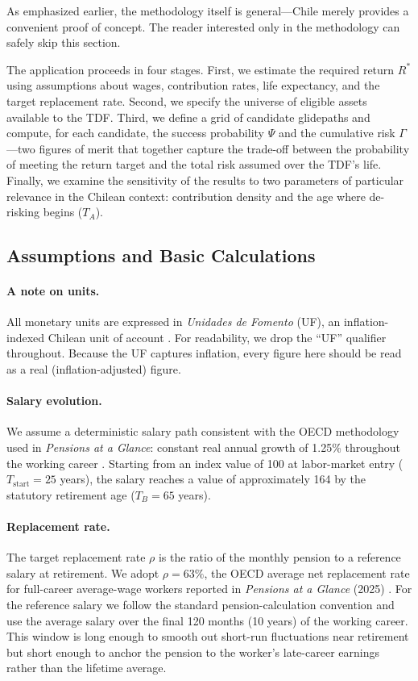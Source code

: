 \documentclass[11pt]{article}
\newcommand{\Tstart}{T_{\mathrm{start}}}
\newcommand{\TA}{T_{A}}
\newcommand{\TB}{T_{B}}
\begin{document}
As emphasized earlier, the methodology itself is general---Chile merely provides a convenient proof of concept. The reader interested only in the methodology can safely skip this section.

The application proceeds in four stages. First, we estimate  the 
required return $R^*$ using assumptions about wages, contribution 
rates, life expectancy, and the target replacement rate. Second, 
we specify the universe of eligible assets available to the TDF. 
Third, we define a grid of candidate glidepaths and compute, for 
each candidate, the success probability $\Psi$ and the cumulative 
risk $\Gamma$---two figures of merit that together capture the 
trade-off between the probability of meeting the return target and 
the total risk assumed over the TDF's life. Finally, we examine 
the sensitivity of the results to two parameters of particular 
relevance in the Chilean context: contribution density and the 
age where de-risking begins ($\TA$).

\subsection{Assumptions and Basic Calculations}

\paragraph{A note on units.}
All monetary units are expressed in \textit{Unidades de Fomento} 
(UF), an inflation-indexed Chilean unit of account \cite{bcchUf}. 
For readability, we drop the ``UF'' qualifier throughout.
 Because the UF captures  inflation, every figure here should be read as a real  (inflation-adjusted) figure. 

\paragraph{Salary evolution.}
We assume a deterministic salary path consistent with the OECD methodology used in \emph{Pensions at a Glance}: constant real annual growth of 1.25\% throughout the working career \cite{oecd2025}. Starting from an index value of 100 at labor-market entry ($\Tstart=25$ years), the salary reaches a value of approximately 164 by the statutory retirement age ($\TB=65$ years).

\paragraph{Replacement rate.}
The target replacement rate $\rho$ is the ratio of the monthly pension to a reference salary at retirement. We adopt $\rho=63\%$, the OECD average net replacement rate for full-career average-wage workers reported in \emph{Pensions at a Glance} (2025) \cite{oecd2025}. For the reference salary we follow the standard pension-calculation convention and use the average salary over the final 120 months (10 years) of the working career. This window is long enough to smooth out short-run fluctuations near retirement but short enough to anchor the pension to the worker's late-career earnings rather than the lifetime average.
\end{document}
